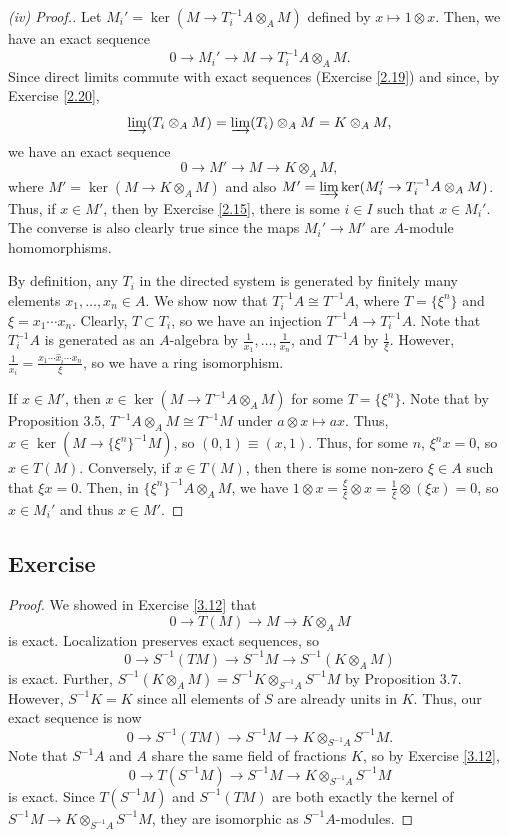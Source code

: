 \begin{proof}[(iv) Proof.]
Let $M_i' = \ker (M \to T_i^{-1}A \otimes_A M)$ defined by $x \mapsto 1 \otimes x$. Then, we have an exact sequence
$$0 \to M_i' \to M \to T_i^{-1}A \otimes_A M.$$
Since direct limits commute with exact sequences (Exercise \ref{2.19}) and since, by Exercise \ref{2.20}, 
$$\varinjlim(T_i \otimes_A M) = \varinjlim(T_i) \otimes_A M = K \otimes_A M,$$
we have an exact sequence
$$0 \to M' \to M \to K \otimes_A M,$$
where $M' = \ker(M \to K \otimes_A M)$ and also $M' = \varinjlim \ker(M_i' \to T_i^{-1}A \otimes_A M)$. Thus, if $x \in M'$, then by Exercise \ref{2.15}, there is some $i \in I$ such that 
$x \in M_i'$. The converse is also clearly true since the maps $M_i' \to M'$ are $A$-module homomorphisms.

By definition, any $T_i$ in the directed system is generated by finitely many elements $x_1,\ldots,x_n \in A$. We show now that $T_i^{-1}A \cong T^{-1}A$, where $T = \{\xi^n\}$ and $\xi = x_1\cdots x_n$.
Clearly, $T \subset T_i$, so we have an injection $T^{-1}A \to T_i^{-1}A$. Note that $T_i^{-1}A$ is generated as an $A$-algebra by $\frac{1}{x_1},\ldots,\frac{1}{x_n}$, and $T^{-1}A$ by $\frac{1}{\xi}$.
However, $\frac{1}{x_i} = \frac{x_1 \cdots \hat x_i \cdots x_n}{\xi}$, so we have a ring isomorphism. 

If $x \in M'$, then $x \in \ker(M \to T^{-1}A \otimes_A M)$ for some $T = \{\xi^n\}$. Note that by Proposition 3.5, $T^{-1}A \otimes_A M \cong T^{-1}M$ under $a \otimes x \mapsto ax$. Thus,
$x \in \ker(M \to \{\xi^n\}^{-1}M)$, so $(0,1) \equiv (x,1)$. Thus, for some $n$, $\xi^n x = 0$, so $x \in T(M)$. Conversely, if $x \in T(M)$, then there is some non-zero $\xi \in A$ such that
$\xi x = 0$. Then, in $\{\xi^n\}^{-1}A \otimes_A M$, we have $1 \otimes x = \frac{\xi}{\xi} \otimes x = \frac{1}{\xi} \otimes (\xi x) = 0$, so $x \in M_i'$ and thus $x \in M'$.
\end{proof}

\subsection{Exercise}\label{3.13}

\begin{proof}
We showed in Exercise \ref{3.12} that
$$0 \to T(M) \to M \to K \otimes_A M$$
is exact. Localization preserves exact sequences, so
$$0 \to S^{-1}(TM) \to S^{-1}M \to S^{-1}(K \otimes_A M)$$
is exact. Further, $S^{-1}(K \otimes_A M) = S^{-1}K \otimes_{S^{-1}A} S^{-1}M$ by Proposition 3.7. However, $S^{-1}K = K$ since all elements of $S$ are already units in $K$. Thus,
our exact sequence is now
$$0 \to S^{-1}(TM) \to S^{-1}M \to K \otimes_{S^{-1}A} S^{-1}M.$$
Note that $S^{-1}A$ and $A$ share the same field of fractions $K$, so by Exercise \ref{3.12},
$$0 \to T(S^{-1}M) \to S^{-1}M \to K \otimes_{S^{-1}A} S^{-1}M$$
is exact. Since $T(S^{-1}M)$ and $S^{-1}(TM)$ are both exactly the kernel of $S^{-1}M \to K \otimes_{S^{-1}A} S^{-1}M$, they are isomorphic as $S^{-1}A$-modules.
\end{proof}

